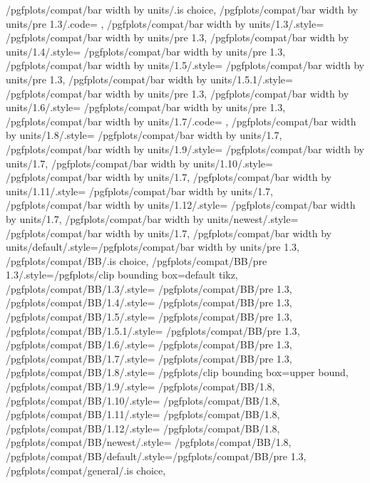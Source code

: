 {	%
	/pgfplots/compat/bar width by units/.is choice,
	/pgfplots/compat/bar width by units/pre 1.3/.code=	{\def\b@pgfplots@compat@bar@width@units{1}},%
	/pgfplots/compat/bar width by units/1.3/.style=	{/pgfplots/compat/bar width by units/pre 1.3},
	/pgfplots/compat/bar width by units/1.4/.style=	{/pgfplots/compat/bar width by units/pre 1.3},%
	/pgfplots/compat/bar width by units/1.5/.style=	{/pgfplots/compat/bar width by units/pre 1.3},%
	/pgfplots/compat/bar width by units/1.5.1/.style=	{/pgfplots/compat/bar width by units/pre 1.3},%
	/pgfplots/compat/bar width by units/1.6/.style=	{/pgfplots/compat/bar width by units/pre 1.3},%
	/pgfplots/compat/bar width by units/1.7/.code=		{\def\b@pgfplots@compat@bar@width@units{0}},%
	/pgfplots/compat/bar width by units/1.8/.style=		{/pgfplots/compat/bar width by units/1.7},
	/pgfplots/compat/bar width by units/1.9/.style=		{/pgfplots/compat/bar width by units/1.7},
	/pgfplots/compat/bar width by units/1.10/.style=		{/pgfplots/compat/bar width by units/1.7},
	/pgfplots/compat/bar width by units/1.11/.style=		{/pgfplots/compat/bar width by units/1.7},
	/pgfplots/compat/bar width by units/1.12/.style=		{/pgfplots/compat/bar width by units/1.7},
	/pgfplots/compat/bar width by units/newest/.style=	{/pgfplots/compat/bar width by units/1.7},
	/pgfplots/compat/bar width by units/default/.style={/pgfplots/compat/bar width by units/pre 1.3},
	/pgfplots/compat/BB/.is choice,
	/pgfplots/compat/BB/pre 1.3/.style={/pgfplots/clip bounding box=default tikz},%
	/pgfplots/compat/BB/1.3/.style=	{/pgfplots/compat/BB/pre 1.3},
	/pgfplots/compat/BB/1.4/.style=	{/pgfplots/compat/BB/pre 1.3},%
	/pgfplots/compat/BB/1.5/.style=	{/pgfplots/compat/BB/pre 1.3},%
	/pgfplots/compat/BB/1.5.1/.style=	{/pgfplots/compat/BB/pre 1.3},%
	/pgfplots/compat/BB/1.6/.style=	{/pgfplots/compat/BB/pre 1.3},%
	/pgfplots/compat/BB/1.7/.style=	{/pgfplots/compat/BB/pre 1.3},%
	/pgfplots/compat/BB/1.8/.style=	{/pgfplots/clip bounding box=upper bound},%
	/pgfplots/compat/BB/1.9/.style=	{/pgfplots/compat/BB/1.8},%
	/pgfplots/compat/BB/1.10/.style=	{/pgfplots/compat/BB/1.8},%
	/pgfplots/compat/BB/1.11/.style=	{/pgfplots/compat/BB/1.8},%
	/pgfplots/compat/BB/1.12/.style=	{/pgfplots/compat/BB/1.8},%
	/pgfplots/compat/BB/newest/.style=	{/pgfplots/compat/BB/1.8},
	/pgfplots/compat/BB/default/.style={/pgfplots/compat/BB/pre 1.3},
	/pgfplots/compat/general/.is choice,
}
